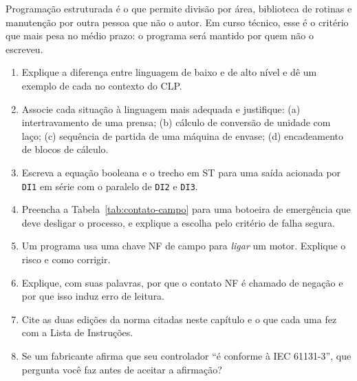 Programação estruturada é o que permite divisão por área, biblioteca de rotinas e manutenção por
outra pessoa que não o autor. Em curso técnico, esse é o critério que mais pesa no médio prazo: o
programa será mantido por quem não o escreveu.

\begin{exercicios}
\begin{enumerate}[label=\alph*)]
  \item Explique a diferença entre linguagem de baixo e de alto nível e dê um exemplo de cada no
        contexto do CLP.
  \item Associe cada situação à linguagem mais adequada e justifique: (a) intertravamento de uma
        prensa; (b) cálculo de conversão de unidade com laço; (c) sequência de partida de uma
        máquina de envase; (d) encadeamento de blocos de cálculo.
  \item Escreva a equação booleana e o trecho em ST para uma saída acionada por \texttt{DI1} em
        série com o paralelo de \texttt{DI2} e \texttt{DI3}.
  \item Preencha a Tabela~\ref{tab:contato-campo} para uma botoeira de emergência que deve desligar o
        processo, e explique a escolha pelo critério de falha segura.
  \item Um programa usa uma chave NF de campo para \emph{ligar} um motor. Explique o risco e como
        corrigir.
  \item Explique, com suas palavras, por que o contato NF é chamado de negação e por que isso induz
        erro de leitura.
  \item Cite as duas edições da norma citadas neste capítulo e o que cada uma fez com a Lista de
        Instruções.
  \item Se um fabricante afirma que seu controlador ``é conforme à IEC 61131-3'', que pergunta você
        faz antes de aceitar a afirmação?
\end{enumerate}
\end{exercicios}
